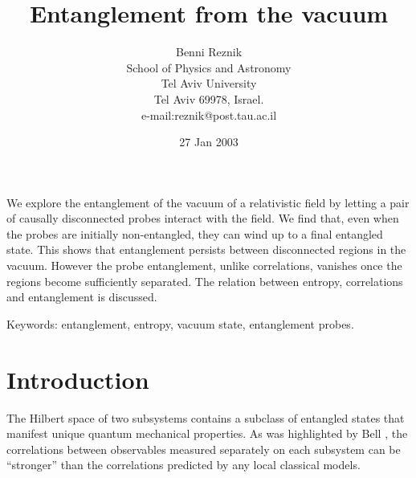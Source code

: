\documentclass[12pt]{article}
\begin{document}
\title{  Entanglement from the vacuum}

\author{
          Benni Reznik \\
          School of Physics and Astronomy \\
          Tel Aviv University \\
          Tel Aviv 69978, Israel.\\
e-mail:reznik@post.tau.ac.il
}
\date{27 Jan 2003}
\maketitle


We explore the entanglement of the vacuum of a relativistic field
by letting a pair of  causally disconnected probes
interact with the field.
We find that, even when the probes are initially non-entangled,
they can wind up to a final entangled state.
This shows that entanglement persists between disconnected
regions in the
vacuum.
However the probe entanglement, unlike correlations,
vanishes once the regions become sufficiently separated.
The relation between entropy, correlations and entanglement is
discussed.

Keywords: entanglement, entropy,
vacuum state, entanglement probes.






\section{\bf Introduction }



The Hilbert space of two subsystems contains a
subclass of entangled states that manifest unique
quantum mechanical properties.
As was highlighted by Bell \cite{bell},
the correlations between observables measured separately
on each subsystem can be ``stronger''  than
the correlations predicted by any local classical models.
\end{document}
